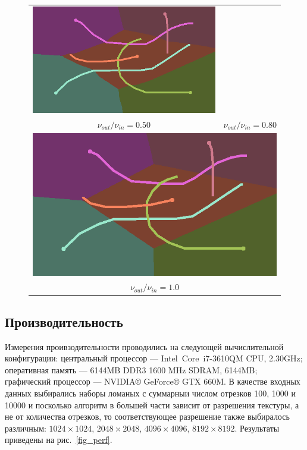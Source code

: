 \documentclass[12pt]{article}
\begin{document}
\begin{figure}
\begin{center}
\begin{tabular}{c c}
\includegraphics[scale=0.2]{sample080.png} \\
$\nu_{out} / \nu_{in} = 0.50$ & $\nu_{out} / \nu_{in} = 0.80$ \\
\multicolumn{2}{c}{\includegraphics[scale=0.2]{sample100.png}} \\
\multicolumn{2}{c}{$\nu_{out} / \nu_{in} = 1.0$}
\end{tabular}
\end{center}
\end{figure}

\subsection{Производительность}
Измерения проивзодительности проводились на следующей вычислительной 
конфигурации: центральный процессор --- Intel\textregistered \,
Core\texttrademark \, i7-3610QM CPU, 2.30GHz;
оперативная память --- 6144MB DDR3 1600 MHz SDRAM, 6144MB; графический процессор 
--- NVIDIA® GeForce® GTX 660M. В качестве входных данных выбирались наборы ломаных
с суммарныи числом отрезков 100, 1000 и 10000 и посколько алгоритм в большей части
зависит от разрешения текстуры, а не от количества отрезков, то соответствующее 
разрешение также выбиралось различным: $1024 \times 1024$, $2048 \times 2048$, 
$4096 \times 4096$, $8192 \times 8192$. Результаты приведены на рис.~\ref{fig_perf}.
\end{document}
